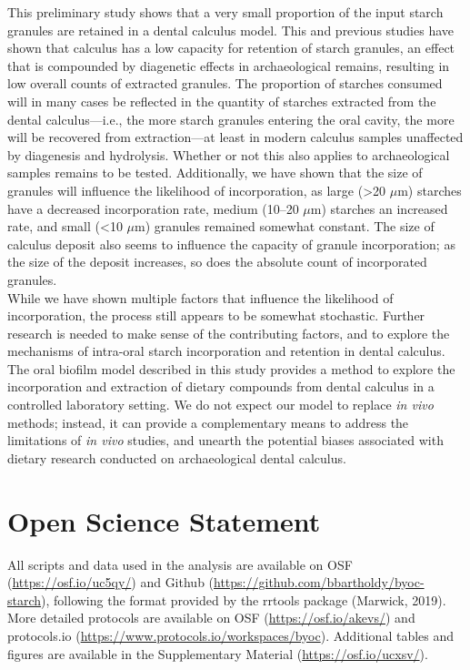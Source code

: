 \documentclass[utf8]{frontiers/frontiersSCNS}
\begin{document}
This preliminary study shows that a very small proportion of the input starch
granules are retained in a dental calculus model. This and previous studies
have shown that calculus has a low capacity for retention of starch granules,
an effect that is compounded by diagenetic effects in archaeological remains,
resulting in low overall counts of extracted granules.
The proportion of starches consumed will in many cases be reflected
in the quantity
of starches extracted from the dental calculus---i.e., the more starch granules
entering the oral cavity, the more will be recovered from extraction---at
least in modern calculus samples unaffected by diagenesis and hydrolysis.
Whether or not this also applies to archaeological samples remains to be tested.
Additionally, we have
shown that the size of granules will influence the likelihood of incorporation,
as large (\textgreater20 \(\mu\)m) starches have a decreased incorporation rate, medium
(10--20 \(\mu\)m)
starches an increased rate, and small (\textless10 \(\mu\)m) granules remained somewhat
constant. The size of calculus deposit also seems to influence the capacity of
granule incorporation; as the size of the deposit increases, so does the
absolute count of incorporated granules.\\
While we have shown multiple factors that influence the likelihood
of incorporation, the process still appears to be somewhat stochastic. Further
research is needed to make sense of the contributing factors, and to explore the
mechanisms of intra-oral starch incorporation and retention in dental calculus.
The oral biofilm model described in this study provides a method
to explore the incorporation and extraction of dietary compounds from dental calculus
in a controlled laboratory setting. We do not expect our model to replace \emph{in vivo}
methods; instead, it can provide a complementary means to address the limitations
of \emph{in vivo} studies, and unearth the potential biases associated
with dietary research conducted on archaeological dental calculus.

\hypertarget{open-science-statement}{%
\section*{Open Science Statement}\label{open-science-statement}}

All scripts and data used in the analysis are available on OSF
(\url{https://osf.io/uc5qy/}) and Github (\url{https://github.com/bbartholdy/byoc-starch}),
following the format provided by the rrtools package (Marwick, 2019).
More detailed protocols are available on OSF (\url{https://osf.io/akevs/})
and protocols.io (\url{https://www.protocols.io/workspaces/byoc}).
Additional tables and figures are available in the Supplementary Material
(\url{https://osf.io/ucxsv/}).
\end{document}
